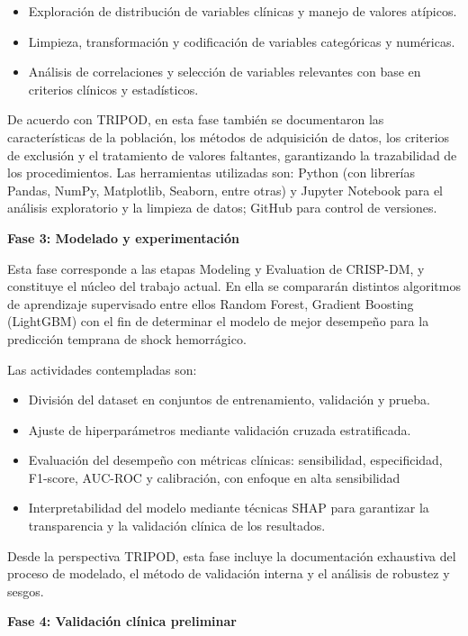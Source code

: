 \begin{itemize}
    \item Exploración de distribución de variables clínicas y manejo de valores atípicos.
    \item Limpieza, transformación y codificación de variables categóricas y numéricas.
    \item Análisis de correlaciones y selección de variables relevantes con base en criterios clínicos y estadísticos.
\end{itemize}

De acuerdo con TRIPOD, en esta fase también se documentaron las características de la población, los métodos de adquisición de datos, los criterios de exclusión y el tratamiento de valores faltantes, garantizando la trazabilidad de los procedimientos. Las herramientas utilizadas son: Python (con librerías Pandas, NumPy, Matplotlib, Seaborn, entre otras) y Jupyter Notebook para el análisis exploratorio y la limpieza de datos; GitHub para control de versiones.

\textbf{Fase 3: Modelado y experimentación}

Esta fase corresponde a las etapas Modeling y Evaluation de CRISP-DM, y constituye el núcleo del trabajo actual. En ella se compararán distintos algoritmos de aprendizaje supervisado entre ellos Random Forest, Gradient Boosting (LightGBM) con el fin de determinar el modelo de mejor desempeño para la predicción temprana de shock hemorrágico.

Las actividades contempladas son:

\begin{itemize}
    \item División del dataset en conjuntos de entrenamiento, validación y prueba.
    \item Ajuste de hiperparámetros mediante validación cruzada estratificada.
    \item Evaluación del desempeño con métricas clínicas: sensibilidad, especificidad, F1-score, AUC-ROC y calibración, con enfoque en alta sensibilidad
    \item Interpretabilidad del modelo mediante técnicas SHAP para garantizar la transparencia y la validación clínica de los resultados.
\end{itemize}

Desde la perspectiva TRIPOD, esta fase incluye la documentación exhaustiva del proceso de modelado, el método de validación interna y el análisis de robustez y sesgos.

\textbf{Fase 4: Validación clínica preliminar}

